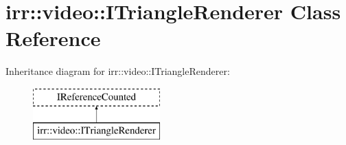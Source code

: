 \hypertarget{classirr_1_1video_1_1_i_triangle_renderer}{\section{irr\-:\-:video\-:\-:I\-Triangle\-Renderer Class Reference}
\label{classirr_1_1video_1_1_i_triangle_renderer}
}
Inheritance diagram for irr\-:\-:video\-:\-:I\-Triangle\-Renderer\-:\begin{figure}[H]
\begin{center}
\leavevmode
\includegraphics[height=2.000000cm]{classirr_1_1video_1_1_i_triangle_renderer}
\end{center}
\end{figure}
